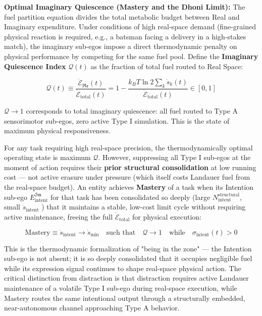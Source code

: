 \documentclass[11pt,a4paper]{article}
\theoremstyle{definition}
\theoremstyle{remark}
\begin{document}
\textbf{Optimal Imaginary Quiescence (Mastery and the Dhoni Limit):} The fuel partition equation divides the total metabolic budget between Real and Imaginary expenditure. Under conditions of high real-space demand (fine-grained physical reaction is required, e.g., a batsman facing a delivery in a high-stakes match), the imaginary sub-egos impose a direct thermodynamic penalty on physical performance by competing for the same fuel pool. Define the \textbf{Imaginary Quiescence Index} $\mathcal{Q}(t)$ as the fraction of total fuel routed to Real Space:


\begin{equation}
\mathcal{Q}(t) \equiv \frac{\dot{\mathcal{E}}_{\mathfrak{Re}}(t)}{\dot{\mathcal{E}}_{\text{total}}(t)} = 1 - \frac{k_B T \ln 2 \sum_k \dot{s}_k(t)}{\dot{\mathcal{E}}_{\text{total}}(t)} \in [0, 1]
\end{equation}


$\mathcal{Q} \to 1$ corresponds to total imaginary quiescence: all fuel routed to Type A sensorimotor sub-egos, zero active Type I simulation. This is the state of maximum physical responsiveness.

For any task requiring high real-space precision, the thermodynamically optimal operating state is maximum $\mathcal{Q}$. However, suppressing all Type I sub-egos at the moment of action requires their \textbf{prior structural consolidation} at low running cost — not active erasure under pressure (which itself costs Landauer fuel from the real-space budget). An entity achieves \textbf{Mastery} of a task when its Intention sub-ego $E_{\text{intent}}^{\mathfrak{Im}}$ for that task has been consolidated so deeply (large $N_{\text{intent}}^{\text{structural}}$, small $\dot{s}_{\text{intent}}$ ) that it maintains a stable, low-cost limit cycle without requiring active maintenance, freeing the full $\dot{\mathcal{E}}_{\text{total}}$ for physical execution:


\begin{equation}
\boxed{\text{Mastery} \equiv \dot{s}_{\text{intent}} \to \dot{s}_{\text{min}} \quad \text{such that} \quad \mathcal{Q} \to 1 \quad \text{while} \quad \sigma_{\text{intent}}(t) > 0}
\end{equation}


This is the thermodynamic formalization of "being in the zone" — the Intention sub-ego is not absent; it is so deeply consolidated that it occupies negligible fuel while its expression signal continues to shape real-space physical action. The critical distinction from distraction is that distraction requires active Landauer maintenance of a volatile Type I sub-ego during real-space execution, while Mastery routes the same intentional output through a structurally embedded, near-autonomous channel approaching Type A behavior.
\end{document}
